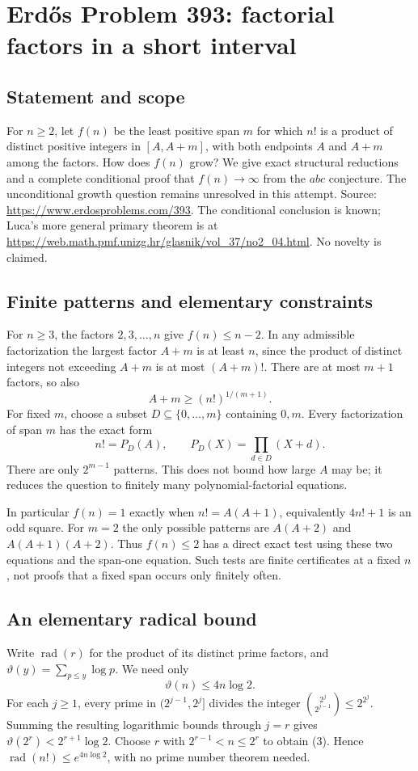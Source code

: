 \section*{Erd\H{o}s Problem 393: factorial factors in a short interval}
\subsection*{Statement and scope}
For $n\ge2$, let $f(n)$ be the least positive span $m$ for which $n!$ is a product of distinct positive integers in $[A,A+m]$, with both endpoints $A$ and $A+m$ among the factors. How does $f(n)$ grow? We give exact structural reductions and a complete conditional proof that $f(n)\to\infty$ from the $abc$ conjecture. The unconditional growth question remains unresolved in this attempt. Source: \url{https://www.erdosproblems.com/393}. The conditional conclusion is known; Luca's more general primary theorem is at \url{https://web.math.pmf.unizg.hr/glasnik/vol_37/no2_04.html}. No novelty is claimed.

\subsection*{Finite patterns and elementary constraints}
For $n\ge3$, the factors $2,3,\ldots,n$ give $f(n)\le n-2$. In any admissible factorization the largest factor $A+m$ is at least $n$, since the product of distinct integers not exceeding $A+m$ is at most $(A+m)!$. There are at most $m+1$ factors, so also
\[
 A+m\ge(n!)^{1/(m+1)}. \tag{1}
\]
For fixed $m$, choose a subset $D\subseteq\{0,\ldots,m\}$ containing $0,m$. Every factorization of span $m$ has the exact form
\[
 n!=P_D(A),\qquad P_D(X)=\prod_{d\in D}(X+d). \tag{2}
\]
There are only $2^{m-1}$ patterns. This does not bound how large $A$ may be; it reduces the question to finitely many polynomial-factorial equations.

In particular $f(n)=1$ exactly when $n!=A(A+1)$, equivalently $4n!+1$ is an odd square. For $m=2$ the only possible patterns are $A(A+2)$ and $A(A+1)(A+2)$. Thus $f(n)\le2$ has a direct exact test using these two equations and the span-one equation. Such tests are finite certificates at a fixed $n$, not proofs that a fixed span occurs only finitely often.

\subsection*{An elementary radical bound}
Write $\operatorname{rad}(r)$ for the product of its distinct prime factors, and $\vartheta(y)=\sum_{p\le y}\log p$. We need only
\[
 \vartheta(n)\le4n\log2. \tag{3}
\]
For each $j\ge1$, every prime in $(2^{j-1},2^j]$ divides the integer $\binom{2^j}{2^{j-1}}\le2^{2^j}$. Summing the resulting logarithmic bounds through $j=r$ gives $\vartheta(2^r)<2^{r+1}\log2$. Choose $r$ with $2^{r-1}<n\le2^r$ to obtain (3). Hence $\operatorname{rad}(n!)\le e^{4n\log2}$, with no prime number theorem needed.

